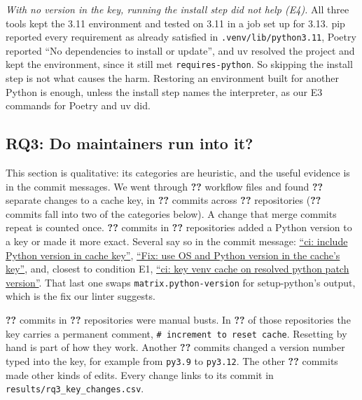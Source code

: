 \documentclass[10pt,a4paper]{article}
\newcommand{\ck}[1]{\textbf{??}}\newcommand{\repourl}{\url{https://github.com/mark124/cache-key-soundness}}%
\begin{document}
\emph{With no version in the key, running the install step did not help
(E4).} All three tools kept the 3.11 environment and tested on 3.11 in a job
set up for 3.13. pip reported every requirement as already satisfied in
\texttt{.venv/lib/python3.11}, Poetry reported ``No dependencies to install or
update'', and uv resolved the project and kept the environment, since it still
met \texttt{requires-python}. So skipping the install step is not what causes
the harm. Restoring an environment built for another Python is enough, unless
the install step names the interpreter, as our E3 commands for Poetry and uv
did.

\subsection{RQ3: Do maintainers run into it?}
\label{sec:rq3}

This section is qualitative: its categories are heuristic, and the useful
evidence is in the commit messages. We went through
\ck{rq3.workflow_files_scanned} workflow files and found
\ck{rq3.key_changes} separate changes to a cache key, in
\ck{rq3.commits_with_any_key_change} commits across
\ck{rq3.repos_with_any_key_change} repositories
(\ck{rq3.commits_in_two_categories} commits fall into two of the categories
below). A change that merge commits
repeat is counted once. \ck{rq3.commits_adds_interpreter} commits in
\ck{rq3.repos_with_adds_interpreter} repositories added a Python version to a
key or made it more exact. Several say so in the commit message:
\href{https://github.com/andreoliwa/nitpick/commit/731d6ebb36a3e3ac39d2574e1abb468b59f0ffe1}{``ci: include Python version in cache key''},
\href{https://github.com/eigenein/protobuf/commit/befb022dcdc84f5ab9936ca793a27d2776a2c015}{``Fix: use OS and Python version in the cache's key''},
and, closest to condition E1,
\href{https://github.com/python-zeroconf/python-zeroconf/commit/0e201f781c96ea77b7388f306f54b21101c6833f}{``ci: key venv cache on resolved python patch version''}.
That last one swaps \texttt{matrix.python-version} for setup-python's output,
which is the fix our linter suggests.

\ck{rq3.commits_manual_bust} commits in \ck{rq3.repos_with_manual_bust}
repositories were manual busts. In \ck{rq3.repos_with_increment_comment} of
those repositories the key carries a permanent comment,
\texttt{\# increment to reset cache}. Resetting by hand is part of how they
work. Another \ck{rq3.commits_version_literal} commits changed a version
number typed into the key, for example from \texttt{py3.9} to
\texttt{py3.12}. The other \ck{rq3.commits_other} commits made other kinds of
edits. Every change links to its commit in
\texttt{results/rq3\_key\_changes.csv}.
\end{document}
